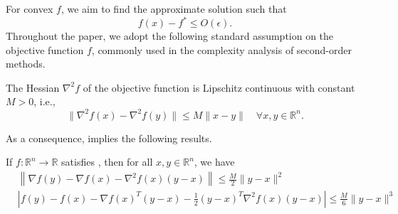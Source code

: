 For convex $f$, we aim to find the approximate solution such that
    \begin{equation}
        \label{eq.conceptual convex approximate solution}
        f(x)-f^* \leq O(\epsilon).
    \end{equation}
Throughout the paper, we adopt the following standard assumption on the objective function $f$, commonly used in the complexity analysis of second-order methods.
\begin{assumption}
    \label{assm.lipschitz}
    The Hessian $\nabla^2 f$ of the objective function is Lipschitz continuous with constant $M>0$, i.e.,
    \begin{equation}
        \label{eq.lipschiz}
        \|\nabla^2 f(x)-\nabla^2 f(y)\| \leq M\|x-y\| \quad \forall x,y\in\mathbb{R}^n.
    \end{equation}
\end{assumption}
As a consequence,  implies the following results.
\begin{lemma}\label{lem.lipschitz}
    If \(f:\mathbb{R}^n \to \mathbb{R}\) satisfies , then for all \(x,y\in \mathbb{R}^n\), we have
    \begin{subequations}
        \begin{align}
            \label{eq.first-order exp}
             & \left\|\nabla f(y)-\nabla f(x)-\nabla^{2} f(x)(y-x)\right\|                       \leq \frac{M}{2}\|y-x\|^{2} \\
            \label{eq.second-order exp}
             & \left|f(y)-f(x)-\nabla f(x)^T(y-x)-\frac{1}{2}(y-x)^T\nabla^{2} f(x)(y-x)\right|  \leq \frac{M}{6}\|y-x\|^{3}
        \end{align}
    \end{subequations}
\end{lemma}

